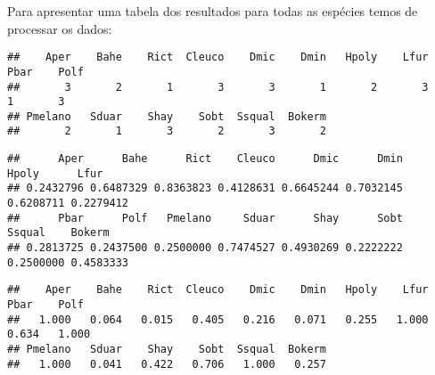\documentclass[
]{book}
\newenvironment{Shaded}{\begin{snugshade}}{\end{snugshade}}
\newcommand{\KeywordTok}[1]{\textcolor[rgb]{0.13,0.29,0.53}{\textbf{#1}}}
\newcommand{\NormalTok}[1]{#1}
\newcommand{\OperatorTok}[1]{\textcolor[rgb]{0.81,0.36,0.00}{\textbf{#1}}}
\newcommand{\StringTok}[1]{\textcolor[rgb]{0.31,0.60,0.02}{#1}}
\begin{document}
Para apresentar uma tabela dos resultados para todas as espécies temos de processar os dados:

\begin{Shaded}
\end{Shaded}

\begin{verbatim}
##    Aper    Bahe    Rict  Cleuco    Dmic    Dmin   Hpoly    Lfur    Pbar    Polf 
##       3       2       1       3       3       1       2       3       1       3 
## Pmelano   Sduar    Shay    Sobt  Ssqual  Bokerm 
##       2       1       3       2       3       2
\end{verbatim}

\begin{Shaded}
\end{Shaded}

\begin{verbatim}
##      Aper      Bahe      Rict    Cleuco      Dmic      Dmin     Hpoly      Lfur 
## 0.2432796 0.6487329 0.8363823 0.4128631 0.6645244 0.7032145 0.6208711 0.2279412 
##      Pbar      Polf   Pmelano     Sduar      Shay      Sobt    Ssqual    Bokerm 
## 0.2813725 0.2437500 0.2500000 0.7474527 0.4930269 0.2222222 0.2500000 0.4583333
\end{verbatim}

\begin{Shaded}
\end{Shaded}

\begin{verbatim}
##    Aper    Bahe    Rict  Cleuco    Dmic    Dmin   Hpoly    Lfur    Pbar    Polf 
##   1.000   0.064   0.015   0.405   0.216   0.071   0.255   1.000   0.634   1.000 
## Pmelano   Sduar    Shay    Sobt  Ssqual  Bokerm 
##   1.000   0.041   0.422   0.706   1.000   0.257
\end{verbatim}

\begin{Shaded}
\end{Shaded}
\end{document}
